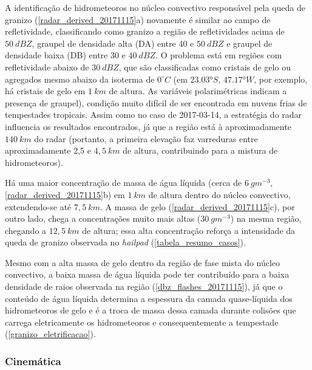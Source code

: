 A identificação de hidrometeoros no núcleo convectivo responsável pela queda de granizo (\autoref{radar_derived_20171115}a) novamente é similar ao campo de refletividade, classificando como granizo a região de refletividades acima de $50\:dBZ$, graupel de densidade alta (DA) entre 40 e $50\:dBZ$ e graupel de densidade baixa (DB) entre 30 e $40\:dBZ$. O problema está em regiões com refletividade abaixo de $30\:dBZ$, que são classificadas como cristais de gelo ou agregados mesmo abaixo da isoterma de $0^{\circ}C$ (em $\ang{23.03}S$, $\ang{47.17}W$, por exemplo, há cristais de gelo em $1\:km$ de altura. As variáveis polarimétricas indicam a presença de graupel), condição muito difícil de ser encontrada em nuvens frias de tempestades tropicais. Assim como no caso de 2017-03-14, a estratégia do radar influencia os resultados encontrados, já que a região está à aproximadamente $140\:km$ do radar (portanto, a primeira elevação faz varreduras entre aproximadamente 2,5 e $4,5\:km$ de altura, contribuindo para a mistura de hidrometeoros).

Há uma maior concentração de massa de água líquida (cerca de $6\:gm^{-3}$, \autoref{radar_derived_20171115}b) em $1\:km$ de altura dentro do núcleo convectivo, extendendo-se até $7,5\:km$. A massa de gelo (\autoref{radar_derived_20171115}c), por outro lado, chega a concentrações muito mais altas ($30\:gm^{-3}$) na mesma região, chegando a $12,5\:km$ de altura; essa alta concentração reforça a intensidade da queda de granizo observada no \textit{hailpad} (\autoref{tabela_resumo_casos}).

Mesmo com a alta massa de gelo dentro da região de fase mista do núcleo convectivo, a baixa massa de água líquida pode ter contribuído para a baixa densidade de raios observada na região (\autoref{dbz_flashes_20171115}), já que o conteúdo de água líquida determina a espessura da camada quase-líquida dos hidrometeoros de gelo e é a troca de massa dessa camada durante colisões que carrega eletricamente os hidrometeoros e consequentemente a tempestade (\autoref{granizo_eletrificacao}).

\subsubsection{Cinemática}\label{cinematica_20171115}

